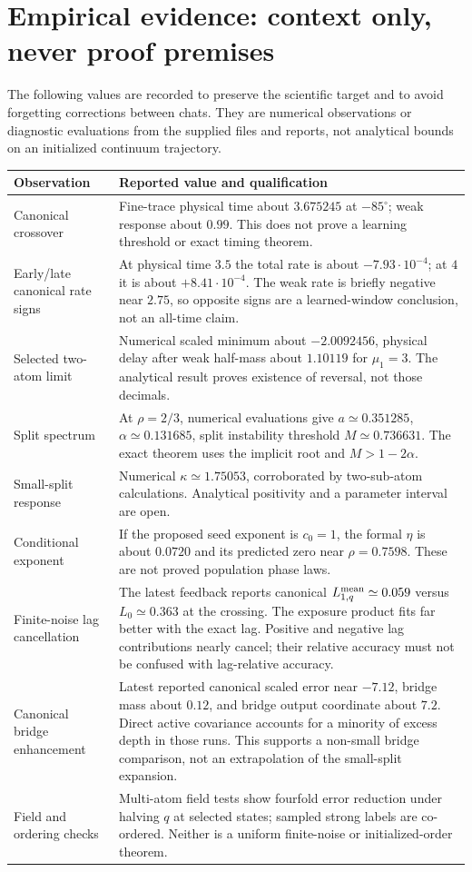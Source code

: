 \documentclass[11pt]{article}
\numberwithin{equation}{section}
\theoremstyle{definition}
\theoremstyle{remark}
\newcommand{\1}{\mathbf 1}
\begin{document}
\appendix
\section{Empirical evidence: context only, never proof premises}\label{pa:evidence}
The following values are recorded to preserve the scientific target and to
avoid forgetting corrections between chats. They are numerical observations
or diagnostic evaluations from the supplied files and reports, not analytical
bounds on an initialized continuum trajectory.

\begin{longtable}{@{}p{}p{}@{}}
\toprule
Observation & Reported value and qualification\\
\midrule
\endhead
Canonical crossover & Fine-trace physical time about $3.675245$ at
$-85^\circ$; weak response about $0.99$. This does not prove a learning
threshold or exact timing theorem.\\
Early/late canonical rate signs & At physical time $3.5$ the total rate is
about $-7.93\cdot10^{-4}$; at $4$ it is about $+8.41\cdot10^{-4}$.
The weak rate is briefly negative near $2.75$, so opposite signs are a
learned-window conclusion, not an all-time claim.\\
Selected two-atom limit & Numerical scaled minimum about $-2.0092456$,
physical delay after weak half-mass about $1.10119$ for $\mu_1=3$.
The analytical result proves existence of reversal, not those decimals.\\
Split spectrum & At $\rho=2/3$, numerical evaluations give
$a\simeq0.351285$, $\alpha\simeq0.131685$, split instability threshold
$M\simeq0.736631$. The exact theorem uses the implicit root and
$M>1-2\alpha$.\\
Small-split response & Numerical $\kappa\simeq1.75053$, corroborated by
two-sub-atom calculations. Analytical positivity and a parameter interval
are open.\\
Conditional exponent & If the proposed seed exponent is $c_0=1$, the
formal $\eta$ is about $0.0720$ and its predicted zero near $\rho=0.7598$.
These are not proved population phase laws.\\
Finite-noise lag cancellation & The latest feedback reports canonical
$L^{\rm mean}_{1,q}\simeq0.059$ versus $L_0\simeq0.363$ at the crossing.
The exposure product fits far better with the exact lag. Positive and
negative lag contributions nearly cancel; their relative accuracy must not
be confused with lag-relative accuracy.\\
Canonical bridge enhancement & Latest reported canonical scaled error near
$-7.12$, bridge mass about $0.12$, and bridge output coordinate about $7.2$.
Direct active covariance accounts for a minority of excess depth in those
runs. This supports a non-small bridge comparison, not an extrapolation
of the small-split expansion.\\
Field and ordering checks & Multi-atom field tests show fourfold error
reduction under halving $q$ at selected states; sampled strong labels are
co-ordered. Neither is a uniform finite-noise or initialized-order theorem.\\
\bottomrule
\end{longtable}
\end{document}
